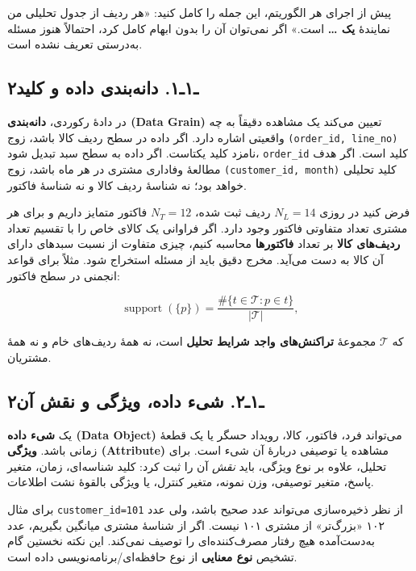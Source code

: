 \documentclass[12pt,a4paper,oneside]{book}
\begin{document}
پیش از اجرای هر الگوریتم، این جمله را کامل کنید: «هر ردیف از جدول تحلیلی من نمایندهٔ \textbf{یک \ldots{}} است.» اگر نمی‌توان آن را بدون ابهام کامل کرد، احتمالاً هنوز مسئله به‌درستی تعریف نشده است.

\subsection{۲ـ۱ـ۱. دانه‌بندی داده و کلید}\label{ux640ux6f1ux640ux6f1.-ux62fux627ux646ux647ux628ux646ux62fux6cc-ux62fux627ux62fux647-ux648-ux6a9ux644ux6ccux62f}

در دادهٔ رکوردی، \textbf{دانه‌بندی (Data Grain)} تعیین می‌کند یک مشاهده دقیقاً به چه واقعیتی اشاره دارد. اگر داده در سطح ردیف کالا باشد، زوج \texttt{(order\_id,\ line\_no)} نامزد کلید یکتاست. اگر داده به سطح سبد تبدیل شود، \texttt{order\_id} کلید است. اگر هدف مطالعهٔ وفاداری مشتری در هر ماه باشد، زوج \texttt{(customer\_id,\ month)} کلید تحلیلی خواهد بود؛ نه شناسهٔ ردیف کالا و نه شناسهٔ فاکتور.

فرض کنید در روزی \(N_L=14\) ردیف ثبت شده، \(N_T=12\) فاکتور متمایز داریم و برای هر مشتری تعداد متفاوتی فاکتور وجود دارد. اگر فراوانی یک کالای خاص را با تقسیم تعداد \textbf{ردیف‌های کالا} بر تعداد \textbf{فاکتورها} محاسبه کنیم، چیزی متفاوت از نسبت سبدهای دارای آن کالا به دست می‌آید. مخرج دقیق باید از مسئله استخراج شود. مثلاً برای قواعد انجمنی در سطح فاکتور:

\[
\operatorname{support}(\{p\})=
\frac{\#\{t\in\mathcal T : p\in t\}}{|\mathcal T|},
\]

که \(\mathcal T\) مجموعهٔ \textbf{تراکنش‌های واجد شرایط تحلیل} است، نه همهٔ ردیف‌های خام و نه همهٔ مشتریان.

\subsection{۲ـ۱ـ۲. شیء داده، ویژگی و نقش آن}\label{ux640ux6f1ux640ux6f2.-ux634ux6ccux621-ux62fux627ux62fux647-ux648ux6ccux698ux6afux6cc-ux648-ux646ux642ux634-ux622ux646}

یک \textbf{شیء داده (Data Object)} می‌تواند فرد، فاکتور، کالا، رویداد حسگر یا یک قطعهٔ زمانی باشد. \textbf{ویژگی (Attribute)} مشاهده یا توصیفی دربارهٔ آن شیء است. برای تحلیل، علاوه بر نوع ویژگی، باید \emph{نقش} آن را ثبت کرد: کلید شناسه‌ای، زمان، متغیر پاسخ، متغیر توصیفی، وزن نمونه، متغیر کنترل، یا ویژگی بالقوهٔ نشت اطلاعات.

برای مثال \texttt{customer\_id=101} از نظر ذخیره‌سازی می‌تواند عدد صحیح باشد، ولی عدد ۱۰۲ «بزرگ‌تر» از مشتری ۱۰۱ نیست. اگر از شناسهٔ مشتری میانگین بگیریم، عدد به‌دست‌آمده هیچ رفتار مصرف‌کننده‌ای را توصیف نمی‌کند. این نکته نخستین گام تشخیص \textbf{نوع معنایی} از نوع حافظه‌ای/برنامه‌نویسی داده است.
\end{document}
